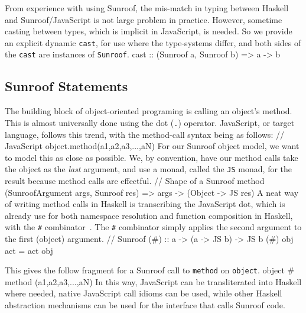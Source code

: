 \documentclass{llncs}
\newcommand{\Src}[1]{{\tt{#1}}}
\newenvironment{Code}{\verbatim}{\endverbatim}
\begin{document}
From experience with using Sunroof,
the mis-match in typing between Haskell and Sunroof/JavaScript
is not large problem in practice.
However, sometime casting between types, which is implicit in JavaScript,
is needed. So we provide an explicit dynamic \Src{cast},
for use where the type-systems differ,
and both sides of the \Src{cast} are instances of \Src{Sunroof}.
\begin{Code}
cast :: (Sunroof a, Sunroof b) => a -> b
\end{Code}

\subsection{Sunroof Statements}

The building block of object-oriented programing is calling an object's method.
This is almost universally done using the dot (\Src{.}) operator. JavaScript, or target language, 
follows this trend, with the method-call syntax being as follows:
\begin{Code}
  // JavaScript
  object.method(a1,a2,a3,...,aN)
\end{Code}
For our Sunroof object model, we want to model this as close as possible.
We, by convention, have our method calls take the object as the {\em last\/} argument,
and use a monad, called the \Src{JS} monad, for the result because method calls are effectful.
\begin{Code}
// Shape of a Sunroof method
(SunroofArgument args, Sunroof res) => args -> (Object -> JS res)
\end{Code}
A neat way of writing method calls in Haskell is transcribing the JavaScript dot, which is already use
for both namespace resolution and function composition in Haskell, with the \Src{\#} combinator~\cite{Shields:01:Babel}.
The \Src{\#} combinator simply applies the second argument to the first (object) argument.
\begin{Code}
// Sunroof        
(#) :: a -> (a -> JS b) -> JS b
(#) obj act = act obj
\end{Code}

\noindent
This gives the follow fragment for a Sunroof call to \Src{method} on \Src{object}.
\begin{Code}
  object # method (a1,a2,a3,...,aN)
\end{Code}
In this way, JavaScript can be transliterated into Haskell where needed,
native JavaScript call idioms can be used,
while other Haskell abstraction mechanisms can be used for the interface that calls Sunroof code.
\end{document}
